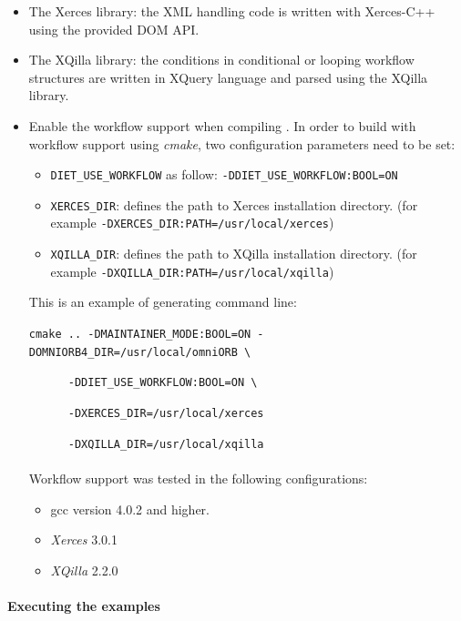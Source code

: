 \begin{itemize}
\item The Xerces library: the XML handling code is written with
  Xerces-C++ using the provided DOM API.
\item The XQilla library: the conditions in conditional or looping workflow structures are written in
  XQuery language and parsed using the XQilla library.
\item Enable the workflow support when compiling \diet. In order to build \diet with workflow support using \textit{cmake}, two
configuration parameters need to be set:

\begin{itemize}
\item \texttt{DIET\_USE\_WORKFLOW} as follow: \texttt{-DDIET\_USE\_WORKFLOW:BOOL=ON}
\item \texttt{XERCES\_DIR}: defines the path to Xerces installation directory.
  (for example \texttt{-DXERCES\_DIR:PATH=/usr/local/xerces})
\item \texttt{XQILLA\_DIR}: defines the path to XQilla installation directory.
  (for example \texttt{-DXQILLA\_DIR:PATH=/usr/local/xqilla})
\end{itemize}

This is an example of generating command line:

\verb|cmake .. -DMAINTAINER_MODE:BOOL=ON -DOMNIORB4_DIR=/usr/local/omniORB \|

\verb|      -DDIET_USE_WORKFLOW:BOOL=ON \|

\verb|      -DXERCES_DIR=/usr/local/xerces|

\verb|      -DXQILLA_DIR=/usr/local/xqilla|

\paragraph{}
Workflow support was tested in the following configurations:

\begin{itemize}
\item gcc version 4.0.2 and higher.
\item \textit{Xerces} 3.0.1
\item \textit{XQilla} 2.2.0
\end{itemize}
\end{itemize}

\paragraph{Executing the examples}

